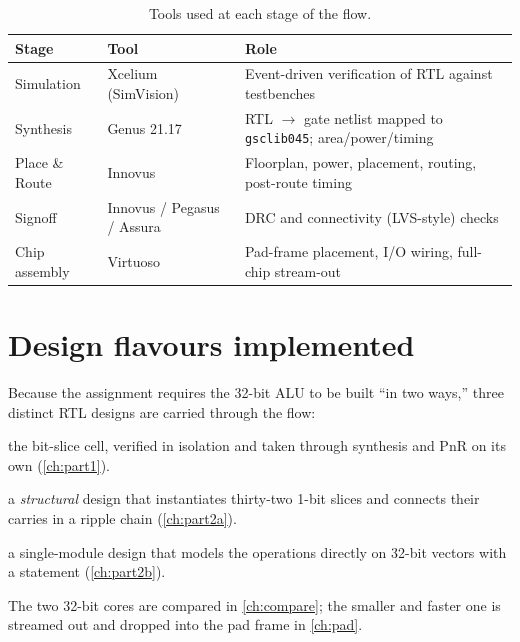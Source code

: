 \begin{table}[htbp]
\centering
\caption{Tools used at each stage of the flow.}
\label{tab:tools}
\small
\begin{tabularx}{\linewidth}{@{}l l X@{}}
\toprule
Stage & Tool & Role \\
\midrule
Simulation      & Xcelium (SimVision) & Event-driven verification of RTL against testbenches \\
Synthesis       & Genus 21.17         & RTL $\rightarrow$ gate netlist mapped to \texttt{gsclib045}; area/power/timing \\
Place \& Route  & Innovus             & Floorplan, power, placement, routing, post-route timing \\
Signoff         & Innovus / Pegasus / Assura & DRC and connectivity (LVS-style) checks \\
Chip assembly   & Virtuoso            & Pad-frame placement, I/O wiring, full-chip stream-out \\
\bottomrule
\end{tabularx}
\end{table}

\section{Design flavours implemented}
Because the assignment requires the 32-bit ALU to be built ``in two
ways,'' three distinct RTL designs are carried through the flow:
\begin{description}[leftmargin=2.4em,style=nextline]
  \item[Part 1 --- 1-bit ALU] the bit-slice cell, verified in isolation
        and taken through synthesis and PnR on its own
        (\cref{ch:part1}).
  \item[Part 2a --- 32-bit hierarchical] a \emph{structural} design that
        instantiates thirty-two 1-bit slices and connects their carries in
        a ripple chain (\cref{ch:part2a}).
  \item[Part 2b --- 32-bit behavioural] a single-module design that models
        the operations directly on 32-bit vectors with a 
        statement (\cref{ch:part2b}).
\end{description}
The two 32-bit cores are compared in \cref{ch:compare}; the smaller and
faster one is streamed out and dropped into the pad frame in
\cref{ch:pad}.
